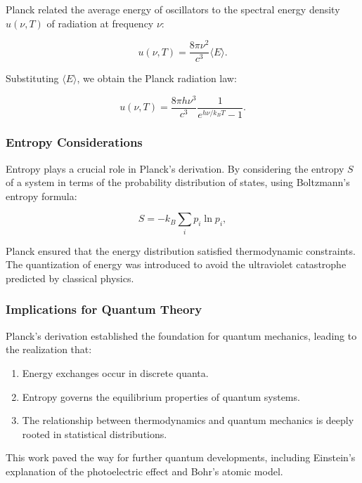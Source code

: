\documentclass[a4paper,10pt]{article}
\begin{document}
Planck related the average energy of oscillators to the spectral energy density $u(\nu, T)$ of radiation at frequency $\nu$:

\begin{equation*}
    u(\nu, T) = \frac{8 \pi \nu^2}{c^3} \langle E \rangle.
\end{equation*}

Substituting $\langle E \rangle$, we obtain the Planck radiation law:

\begin{equation*}
    u(\nu, T) = \frac{8 \pi h \nu^3}{c^3} \frac{1}{e^{h \nu / k_B T} - 1}.
\end{equation*}

\subsubsection*{Entropy Considerations}

Entropy plays a crucial role in Planck's derivation. By considering the entropy $S$ of a system in terms of the probability distribution of states, using Boltzmann's entropy formula:

\begin{equation*}
    S = - k_B \sum_i p_i \ln p_i,
\end{equation*}

Planck ensured that the energy distribution satisfied thermodynamic constraints. The quantization of energy was introduced to avoid the ultraviolet catastrophe predicted by classical physics.

\subsubsection*{Implications for Quantum Theory}

Planck's derivation established the foundation for quantum mechanics, leading to the realization that:
\begin{enumerate}
    \item Energy exchanges occur in discrete quanta.
    \item Entropy governs the equilibrium properties of quantum systems.
    \item The relationship between thermodynamics and quantum mechanics is deeply rooted in statistical distributions.
\end{enumerate}

This work paved the way for further quantum developments, including Einstein's explanation of the photoelectric effect and Bohr's atomic model.
\end{document}
